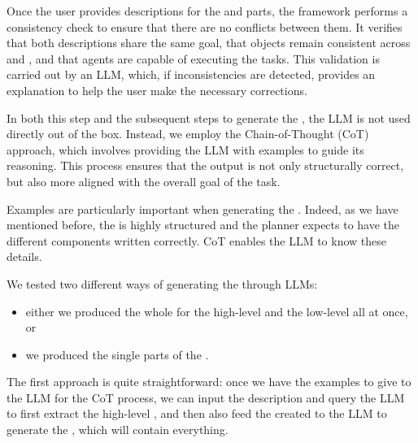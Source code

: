 Once the user provides descriptions for the \HL and \LL parts, the framework performs a consistency check to ensure that there are no conflicts between them. It verifies that both descriptions share the same goal, that objects remain consistent across \HL and \LL, and that agents are capable of executing the tasks. This validation is carried out by an LLM, which, if inconsistencies are detected, provides an explanation to help the user make the necessary corrections.

In both this step and the subsequent steps to generate the \kb, the LLM is not used directly out of the box. Instead, we employ the Chain-of-Thought (CoT)~\cite{wei2022chain} approach, which involves providing the LLM with examples to guide its reasoning. This process ensures that the output is not only structurally correct, but also more aligned with the overall goal of the task.

Examples are particularly important when generating the \kb. Indeed, as we have mentioned before, the \kbase is highly structured and the planner expects to have the different components written correctly. CoT enables the LLM to know these details. 

We tested two different ways of generating the \kb through LLMs:
\begin{itemize}
    \item either we produced the whole \kb for the high-level and the low-level all at once, or
    \item we produced the single parts of the \kbs. 
\end{itemize}

The first approach is quite straightforward: once we have the examples to give to the LLM for the CoT process, we can input the \HL description and query the LLM to first extract the high-level \kb, and then also feed the created \HL \kb to the LLM to generate the \LL \kb, which will contain everything. %

